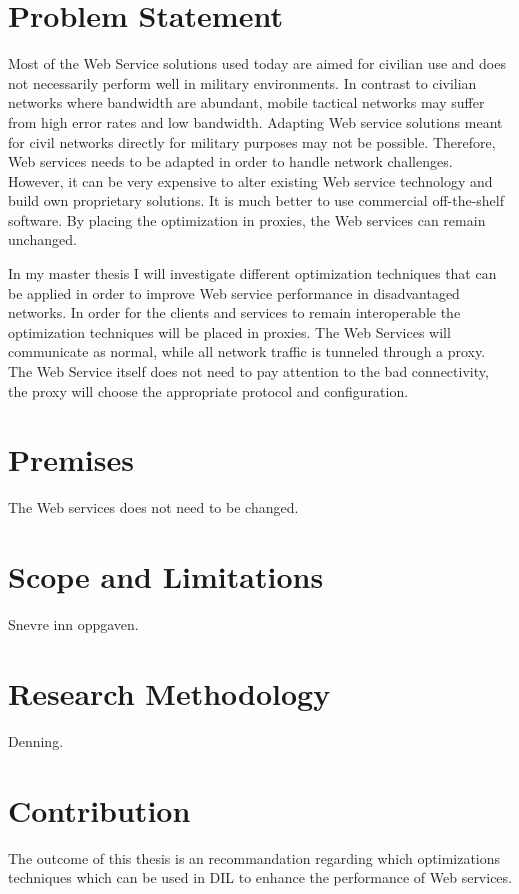 \documentclass[USenglish]{ifimaster}
\begin{document}
\section{Problem Statement}
Most of the Web Service solutions used today are aimed for civilian use and does not necessarily perform well in military environments. In contrast to civilian networks where bandwidth are abundant, mobile tactical networks may suffer from high error rates and low bandwidth. Adapting Web service solutions meant for civil networks directly for military purposes may not be possible. Therefore, Web services needs to be adapted in order to handle network challenges. However, it can be very expensive to alter existing Web service technology and build own proprietary solutions. It is much better to use commercial off-the-shelf software. By placing the optimization in proxies, the Web services can remain unchanged.

In my master thesis I will investigate different optimization techniques that can be applied in order to improve Web service performance in disadvantaged networks. In order for the clients and services to remain interoperable the optimization techniques will be placed in proxies. The Web Services will communicate as normal, while all network traffic is tunneled through a proxy. The Web Service itself does not need to pay attention to the bad connectivity, the proxy will choose the appropriate protocol and configuration.

\section{Premises}
The Web services does not need to be changed.

\section{Scope and Limitations}
Snevre inn oppgaven.

\section{Research Methodology}
Denning.

\section{Contribution}
The outcome of this thesis is an recommandation regarding which optimizations techniques which can be used in DIL to enhance the performance of Web services.
\end{document}
